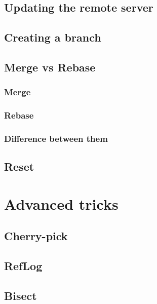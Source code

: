 \documentclass{article}
\begin{document}
\subsection{Updating the remote server}

\subsection{Creating a branch}

\subsection{Merge vs Rebase}

\subsubsection{Merge}

\subsubsection{Rebase}

\subsubsection{Difference between them}

\subsection{Reset}

\section{Advanced tricks}

\subsection{Cherry-pick}

\subsection{RefLog}

\subsection{Bisect}

\subsection{}
\end{document}
